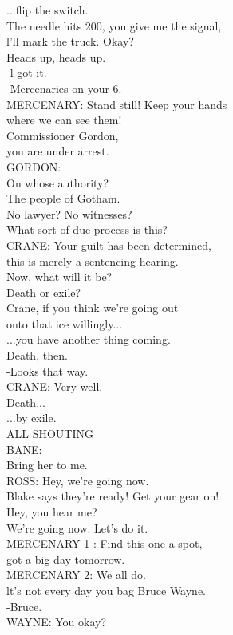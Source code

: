 \documentclass{article}
\begin{document}
\begin{multicols}{3}
...flip the switch.\\
The needle hits 200, you give me the signal,\\
l'll mark the truck. Okay?\\
Heads up, heads up.\\
-l got it.\\
-Mercenaries on your 6.\\
MERCENARY: Stand still! Keep your hands\\
where we can see them!\\
Commissioner Gordon,\\
you are under arrest.\\
GORDON:\\
On whose authority?\\
The people of Gotham.\\
No lawyer? No witnesses?\\
What sort of due process is this?\\
CRANE: Your guilt has been determined,\\
this is merely a sentencing hearing.\\
Now, what will it be?\\
Death or exile?\\
Crane, if you think we're going out\\
onto that ice willingly...\\
...you have another thing coming.\\
Death, then.\\
-Looks that way.\\
CRANE: Very well.\\
Death...\\
...by exile.\\
ALL SHOUTING\\
BANE:\\
Bring her to me.\\
ROSS: Hey, we're going now.\\
Blake says they're ready! Get your gear on!\\
Hey, you hear me?\\
We're going now. Let's do it.\\
MERCENARY 1 : Find this one a spot,\\
got a big day tomorrow.\\
MERCENARY 2: We all do.\\
lt's not every day you bag Bruce Wayne.\\
-Bruce.\\
WAYNE: You okay?\\

\end{multicols}
\end{document}
